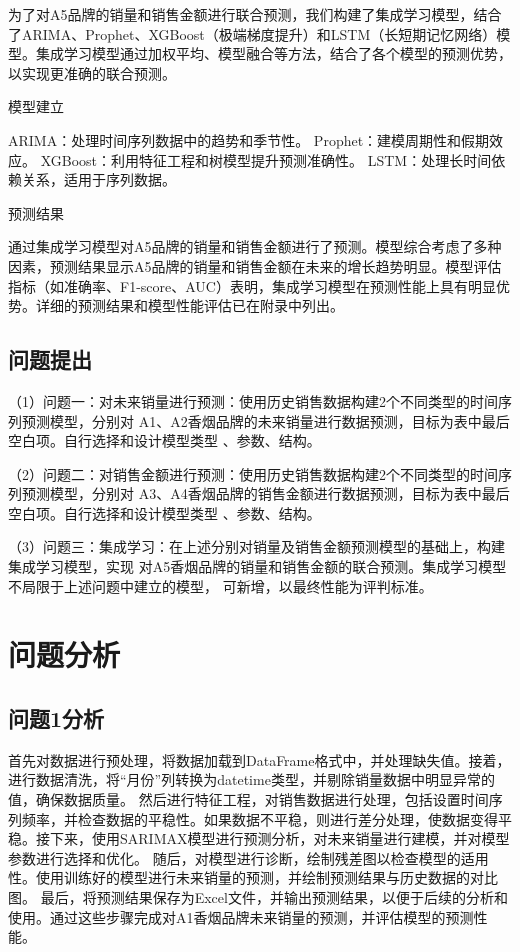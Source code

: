 \documentclass[a4paper]{article}
\begin{document}
	为了对A5品牌的销量和销售金额进行联合预测，我们构建了集成学习模型，结合了ARIMA、Prophet、XGBoost（极端梯度提升）和LSTM（长短期记忆网络）模型。集成学习模型通过加权平均、模型融合等方法，结合了各个模型的预测优势，以实现更准确的联合预测。
	
	模型建立
	
	ARIMA：处理时间序列数据中的趋势和季节性。
	Prophet：建模周期性和假期效应。
	XGBoost：利用特征工程和树模型提升预测准确性。
	LSTM：处理长时间依赖关系，适用于序列数据。
	
	预测结果
	
	通过集成学习模型对A5品牌的销量和销售金额进行了预测。模型综合考虑了多种因素，预测结果显示A5品牌的销量和销售金额在未来的增长趋势明显。模型评估指标（如准确率、F1-score、AUC）表明，集成学习模型在预测性能上具有明显优势。详细的预测结果和模型性能评估已在附录中列出。
	
	\subsection{问题提出}
	（1）问题一：对未来销量进行预测：使用历史销售数据构建2个不同类型的时间序列预测模型，分别对
A1、A2香烟品牌的未来销量进行数据预测，目标为表中最后空白项。自行选择和设计模型类型
、参数、结构。

	（2）问题二：对销售金额进行预测：使用历史销售数据构建2个不同类型的时间序列预测模型，分别对
	A3、A4香烟品牌的销售金额进行数据预测，目标为表中最后空白项。自行选择和设计模型类型
	、参数、结构。

	（3）问题三：集成学习：在上述分别对销量及销售金额预测模型的基础上，构建集成学习模型，实现
	对A5香烟品牌的销量和销售金额的联合预测。集成学习模型不局限于上述问题中建立的模型，
	可新增，以最终性能为评判标准。
	\section{问题分析}
	\subsection{问题1分析}
	首先对数据进行预处理，将数据加载到DataFrame格式中，并处理缺失值。接着，进行数据清洗，将“月份”列转换为datetime类型，并剔除销量数据中明显异常的值，确保数据质量。
然后进行特征工程，对销售数据进行处理，包括设置时间序列频率，并检查数据的平稳性。如果数据不平稳，则进行差分处理，使数据变得平稳。接下来，使用SARIMAX模型进行预测分析，对未来销量进行建模，并对模型参数进行选择和优化。
随后，对模型进行诊断，绘制残差图以检查模型的适用性。使用训练好的模型进行未来销量的预测，并绘制预测结果与历史数据的对比图。
最后，将预测结果保存为Excel文件，并输出预测结果，以便于后续的分析和使用。通过这些步骤完成对A1香烟品牌未来销量的预测，并评估模型的预测性能。
\end{document}
